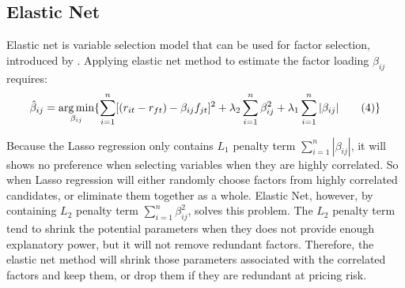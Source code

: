 \subsection{Elastic Net}

Elastic net  is variable selection model that can be used for factor selection, introduced by . Applying elastic net method to estimate the factor loading $\beta_{ij}$ requires:
	\[   \hat{\beta}_{ij}  = \operatorname*{arg\,min}_{\beta_{ij}}\{\sum_{i = 1}^{n}[(r_{it} - r_{ft}) - \beta_{ij }f_{jt}]^2 + \lambda_2\sum_{i = 1}^{n}\beta_{ij}^2  + \lambda_1\sum_{i = 1}^{n}|\beta_{ij}|  \label{ENcriterion} \tag{4}   \}    \]
	
	
	
Because the Lasso regression only contains $L_1$ penalty term $\sum_{i = 1}^{n} |\beta_{ij}|$, it will shows no preference when selecting variables when they are highly correlated.
So when Lasso regression will either randomly choose factors from highly correlated candidates, or eliminate them together as a whole.  
Elastic Net, however, by containing $L_2$ penalty term $\sum_{i=1}^{n}\beta_{ij}^2$, solves this problem. 
The $L_2$ penalty term tend to shrink the potential parameters when they does not provide enough explanatory power, but it will not remove redundant factors.
Therefore, the elastic net method will shrink those parameters associated with the correlated factors and keep them, or drop them if they are redundant at pricing risk. 
	